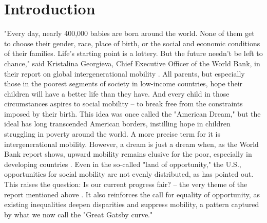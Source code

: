 \section{Introduction}

"Every day, nearly 400,000 babies are born around the world. None of them get to choose their gender, race, place of birth, or the social and economic conditions of their families. Life’s starting point is a lottery. But the future needn’t be left to chance," said Kristalina Georgieva, Chief Executive Officer of the World Bank, in their report on global intergenerational mobility \citep{narayan2018fair}. All parents, but especially those in the poorest segments of society in low-income countries, hope their children will have a better life than they have. And every child in those circumstances aspires to social mobility -- to break free from the constraints imposed by their birth. This idea was once called the "American Dream," but the ideal has long transcended American borders, instilling hope in children struggling in poverty around the world. A more precise term for it is intergenerational mobility. However, a dream is just a dream when, as the World Bank report shows, upward mobility remains elusive for the poor, especially in developing countries \citep{narayan2018fair}. Even in the so-called "land of opportunity," the U.S., opportunities for social mobility are not evenly distributed, as \citet{chetty2014land} has pointed out. This raises the question: Is our current progress fair? -- the very theme of the report mentioned above \citep{narayan2018fair}. It also reinforces the call for equality of opportunity, as existing inequalities deepen disparities and suppress mobility, a pattern captured by what we now call the "Great Gatsby curve."

